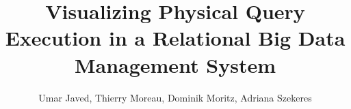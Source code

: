 \documentclass{article}
\begin{document}
\title{Visualizing Physical Query Execution in a Relational Big Data Management System}
\author{Umar Javed, Thierry Moreau, Dominik Moritz, Adriana Szekeres}

\maketitle








\end{document}
